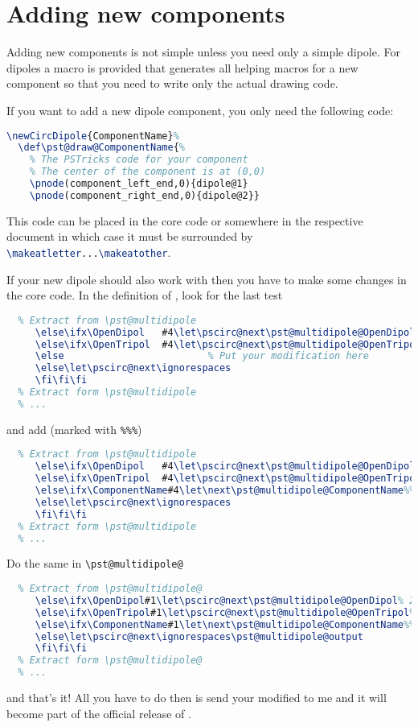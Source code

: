 \documentclass[11pt,english,BCOR10mm,DIV12,bibliography=totoc,parskip=false,smallheadings
    headexclude,footexclude,oneside]{pst-doc}
\begin{document}
\section{Adding new components}

Adding new components is not simple unless you need only a simple dipole. For dipoles a macro is provided that generates all helping macros for a new component so that you need to write only the actual drawing code.

If you want to add a new dipole component, you only need the following code:
\begin{lstlisting}[language=TeX]
  \newCircDipole{ComponentName}%
  \def\pst@draw@ComponentName{%
    % The PSTricks code for your component
    % The center of the component is at (0,0)
    \pnode(component_left_end,0){dipole@1}
    \pnode(component_right_end,0){dipole@2}}
\end{lstlisting}
This code can be placed in the core code or somewhere in the respective document in which case it must be surrounded by \lstinline[language=TeX]{\makeatletter...\makeatother}.

If your new dipole should also work with  then you have to make some changes in the  core code. In the definition
of , look for the last  test
\begin{lstlisting}[language=TeX]
  % ...
  % Extract from \pst@multidipole
     \else\ifx\OpenDipol   #4\let\pscirc@next\pst@multidipole@OpenDipol% 27
     \else\ifx\OpenTripol  #4\let\pscirc@next\pst@multidipole@OpenTripol% 28
     \else                         % Put your modification here
     \else\let\pscirc@next\ignorespaces
     \fi\fi\fi
  % Extract form \pst@multidipole
  % ...
\end{lstlisting}
and add (marked with \verb+%%%+)
\begin{lstlisting}[language=TeX]
  % ...
  % Extract from \pst@multidipole
     \else\ifx\OpenDipol   #4\let\pscirc@next\pst@multidipole@OpenDipol% 27
     \else\ifx\OpenTripol  #4\let\pscirc@next\pst@multidipole@OpenTripol% 28
     \else\ifx\ComponentName#4\let\next\pst@multidipole@ComponentName%%%
     \else\let\pscirc@next\ignorespaces
     \fi\fi\fi
  % Extract form \pst@multidipole
  % ...
\end{lstlisting}
Do the same in \verb+\pst@multidipole@+
\begin{lstlisting}[language=TeX]
  % ...
  % Extract from \pst@multidipole@
     \else\ifx\OpenDipol#1\let\pscirc@next\pst@multidipole@OpenDipol% 27
     \else\ifx\OpenTripol#1\let\pscirc@next\pst@multidipole@OpenTripol% 28
     \else\ifx\ComponentName#1\let\next\pst@multidipole@ComponentName%%%
     \else\let\pscirc@next\ignorespaces\pst@multidipole@output
     \fi\fi\fi
  % Extract form \pst@multidipole@
  % ...
\end{lstlisting}
and that's it! All you have to do then is send your modified  to 
me and  it will become part of the official release of .
\end{document}
